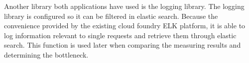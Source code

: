 Another library both applications have used is the logging library. The logging library is configured so it can be filtered in elastic search. Because the convenience provided by the existing cloud foundry ELK platform, it is able to log information relevant to single requests and retrieve them through elastic search. This function is used later when comparing the measuring results and determining the bottleneck. 
     

